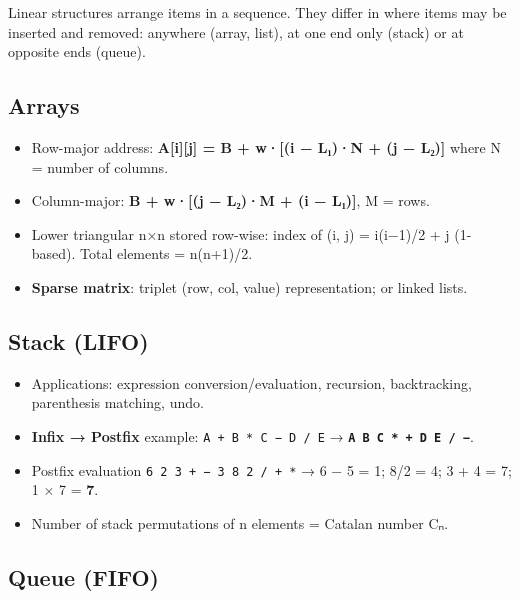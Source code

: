 Linear structures arrange items in a sequence. They differ in where items may be inserted and removed: anywhere
(array, list), at one end only (stack) or at opposite ends (queue).

\needspace{95pt}

\hypertarget{p2-07--21-arrays}{%
\subsection{Arrays}\label{p2-07--21-arrays}}

\begin{itemize}
\tightlist
\item
  Row-major address: \textbf{A{[}i{]}{[}j{]} = B + w·{[}(i − L₁)·N + (j − L₂){]}} where N = number of columns.
\item
  Column-major: \textbf{B + w·{[}(j − L₂)·M + (i − L₁){]}}, M = rows.
\item
  Lower triangular n×n stored row-wise: index of (i, j) = i(i−1)/2 + j (1-based). Total elements = n(n+1)/2.
\item
  \textbf{Sparse matrix}: triplet (row, col, value) representation; or linked lists.
\end{itemize}

\needspace{95pt}

\hypertarget{p2-07--22-stack-lifo}{%
\subsection{Stack (LIFO)}\label{p2-07--22-stack-lifo}}

\begin{itemize}
\tightlist
\item
  Applications: expression conversion/evaluation, recursion, backtracking, parenthesis matching, undo.
\item
  \textbf{Infix → Postfix} example: \texttt{A\ +\ B\ *\ C\ −\ D\ /\ E} → \textbf{\texttt{A\ B\ C\ *\ +\ D\ E\ /\ −}}.
\item
  Postfix evaluation \texttt{6\ 2\ 3\ +\ −\ 3\ 8\ 2\ /\ +\ *} → 6 − 5 = 1; 8/2 = 4; 3 + 4 = 7; 1 × 7 = \textbf{7}.
\item
  Number of stack permutations of n elements = Catalan number Cₙ.
\end{itemize}

\needspace{95pt}

\hypertarget{p2-07--23-queue-fifo}{%
\subsection{Queue (FIFO)}\label{p2-07--23-queue-fifo}}

